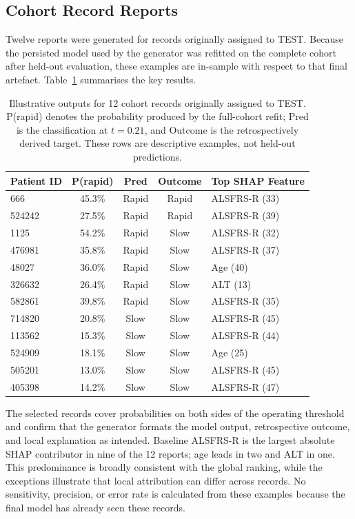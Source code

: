 \subsection{Cohort Record Reports}
\label{subsec:results_real_reports}

Twelve reports were generated for records originally assigned to \gls{TEST}.
Because the persisted model used by the generator was refitted on the complete cohort after held-out evaluation, these examples are in-sample with respect to that final artefact.
Table~\ref{tab:real_patient_reports} summarises the key results.

\begin{table}[ht!]
\centering
\caption[Reports for 12 cohort records]{Illustrative outputs for 12 cohort records originally assigned to TEST. P(rapid) denotes the probability produced by the full-cohort refit; Pred is the classification at $t=0.21$, and Outcome is the retrospectively derived target. These rows are descriptive examples, not held-out predictions.}
\label{tab:real_patient_reports}
\small
\begin{tabular}{lcccl}
\toprule
Patient ID & P(rapid) & Pred & Outcome & Top SHAP Feature \\
\midrule
666     & 45.3\% & Rapid & Rapid & ALSFRS-R (33) \\
524242  & 27.5\% & Rapid & Rapid & ALSFRS-R (39) \\
1125    & 54.2\% & Rapid & Slow  & ALSFRS-R (32) \\
476981  & 35.8\% & Rapid & Slow  & ALSFRS-R (37) \\
48027   & 36.0\% & Rapid & Slow  & Age (40) \\
326632  & 26.4\% & Rapid & Slow  & ALT (13) \\
582861  & 39.8\% & Rapid & Slow  & ALSFRS-R (35) \\
714820  & 20.8\% & Slow  & Slow  & ALSFRS-R (45) \\
113562  & 15.3\% & Slow  & Slow  & ALSFRS-R (44) \\
524909  & 18.1\% & Slow  & Slow  & Age (25) \\
505201  & 13.0\% & Slow  & Slow  & ALSFRS-R (45) \\
405398  & 14.2\% & Slow  & Slow  & ALSFRS-R (47) \\
\bottomrule
\end{tabular}
\end{table}

\noindent The selected records cover probabilities on both sides of the operating threshold and confirm that the generator formats the model output, retrospective outcome, and local explanation as intended.
Baseline ALSFRS-R is the largest absolute SHAP contributor in nine of the 12 reports; age leads in two and ALT in one.
This predominance is broadly consistent with the global ranking, while the exceptions illustrate that local attribution can differ across records.
No sensitivity, precision, or error rate is calculated from these examples because the final model has already seen these records.

